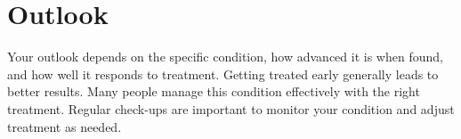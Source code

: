 \section{Outlook}
Your outlook depends on the specific condition, how advanced it is when found, and how well it responds to treatment. Getting treated early generally leads to better results. Many people manage this condition effectively with the right treatment. Regular check-ups are important to monitor your condition and adjust treatment as needed.
